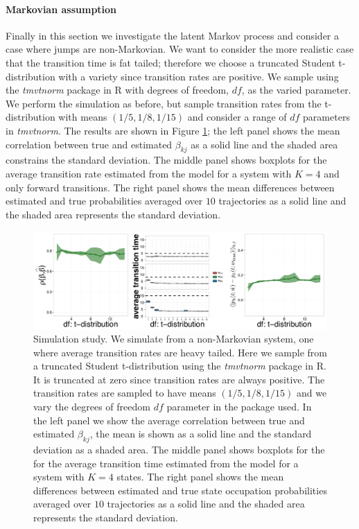 \paragraph{Markovian assumption}
\label{sec:stud-t-distr}

Finally in this section we investigate the latent Markov process and consider a case where jumps are non-Markovian. We want to consider the more realistic case that the transition time is fat tailed; therefore we choose a truncated Student t-distribution with a variety since transition rates are positive. We sample using the \emph{tmvtnorm} package in R with degrees of freedom, $df$, as the varied parameter. We perform the simulation as before, but sample transition rates from the t-distribution with means $(1/5, 1/8, 1/15)$ and consider a range of $df$ parameters in \emph{tmvtnorm}. The results are shown in Figure \ref{fig:student}; the left panel shows the mean correlation between true and estimated $\beta_{kj}$ as a solid line and the shaded area constrains the standard deviation. The middle panel shows boxplots for the average transition rate estimated from the model for a system with $K=4$ and only forward transitions. The right panel shows the mean differences between estimated and true probabilities averaged over $10$ trajectories as a solid line and the shaded area represents the standard deviation.

\begin{figure}[h]
  \centering \includegraphics[width=1\textwidth]{pics/student-t.pdf}
  \caption{Simulation study. We simulate from a non-Markovian system, one where average transition rates are heavy tailed. Here we sample from a truncated Student t-distribution using the \emph{tmvtnorm} package in R. It is truncated at zero since transition rates are always positive. The transition rates are sampled to have means $(1/5, 1/8, 1/15)$ and we vary the degrees of freedom $df$ parameter in the package used. In the left panel we show the average correlation between true and estimated $\beta_{kj}$, the mean is shown as a solid line and the standard deviation as a shaded area. The middle panel shows boxplots for the for the average transition time estimated from the model for a system with $K=4$ states. The right panel shows the mean differences between estimated and true state occupation probabilities averaged over $10$ trajectories as a solid line and the shaded area represents the standard deviation.}
\label{fig:student}
\end{figure}


